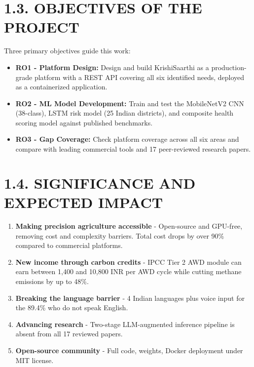 \documentclass[12pt, a4paper]{report}
\begin{document}
\section{1.3. OBJECTIVES OF THE PROJECT}
Three primary objectives guide this work:

\begin{itemize}[leftmargin=*]
  \item \textbf{RO1 - Platform Design:} Design and build KrishiSaarthi as a production-grade platform with a REST API covering all six identified needs, deployed as a containerized application.
  \item \textbf{RO2 - ML Model Development:} Train and test the MobileNetV2 CNN (38-class), LSTM risk model (25 Indian districts), and composite health scoring model against published benchmarks.
  \item \textbf{RO3 - Gap Coverage:} Check platform coverage across all six areas and compare with leading commercial tools and 17 peer-reviewed research papers.
\end{itemize}
\section{1.4. SIGNIFICANCE AND EXPECTED IMPACT}
\begin{enumerate}[leftmargin=*]
  \item \textbf{Making precision agriculture accessible} - Open-source and GPU-free, removing cost and complexity barriers. Total cost drops by over 90\% compared to commercial platforms.
  \item \textbf{New income through carbon credits} - IPCC Tier 2 AWD module can earn between 1,400 and 10,800 INR per AWD cycle while cutting methane emissions by up to 48\%.
  \item \textbf{Breaking the language barrier} - 4 Indian languages plus voice input for the 89.4\% who do not speak English.
  \item \textbf{Advancing research} - Two-stage LLM-augmented inference pipeline is absent from all 17 reviewed papers.
  \item \textbf{Open-source community} - Full code, weights, Docker deployment under MIT license.
\end{enumerate}
\end{document}
